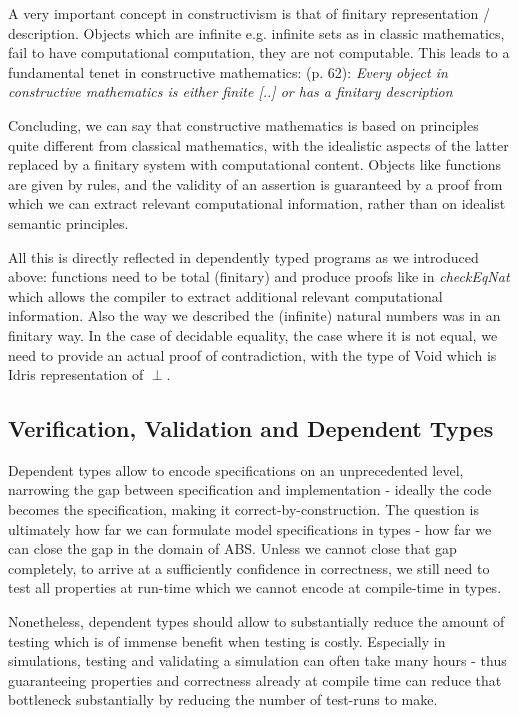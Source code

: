 A very important concept in constructivism is that of finitary representation / description. Objects which are infinite e.g. infinite sets as in classic mathematics, fail to have computational computation, they are not computable. This leads to a fundamental tenet in constructive mathematics: \cite{thompson_type_1991} (p. 62): \textit{Every object in constructive mathematics is either finite [..] or has a finitary description}

Concluding, we can say that constructive mathematics is based on principles quite different from classical mathematics, with the idealistic aspects of the latter replaced by a finitary system with computational content. Objects like functions are given by rules, and the validity of an assertion is guaranteed by a proof from which we can extract relevant computational information, rather than on idealist semantic principles. 

All this is directly reflected in dependently typed programs as we introduced above: functions need to be total (finitary) and produce proofs like in \textit{checkEqNat} which allows the compiler to extract additional relevant computational information. Also the way we described the (infinite) natural numbers was in an finitary way. In the case of decidable equality, the case where it is not equal, we need to provide an actual proof of contradiction, with the type of Void which is Idris representation of $\perp$. 

\subsection{Verification, Validation and Dependent Types}
\label{sec:dep_vav_deptypes}
Dependent types allow to encode specifications on an unprecedented level, narrowing the gap between specification and implementation - ideally the code becomes the specification, making it correct-by-construction. The question is ultimately how far we can formulate model specifications in types - how far we can close the gap in the domain of ABS. Unless we cannot close that gap completely, to arrive at a sufficiently confidence in correctness, we still need to test all properties at run-time which we cannot encode at compile-time in types.

Nonetheless, dependent types should allow to substantially reduce the amount of testing which is of immense benefit when testing is costly. Especially in simulations, testing and validating a simulation can often take many hours - thus guaranteeing properties and correctness already at compile time can reduce that bottleneck substantially by reducing the number of test-runs to make.

